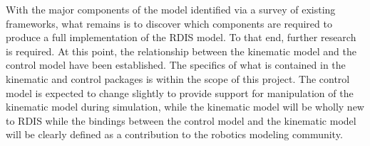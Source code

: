 With the major components of the model identified via a survey of existing frameworks, what remains is to discover which components are required to produce a full implementation of the RDIS model. To that end, further research is required. At this point, the relationship between the kinematic model and the control model have been established. The specifics of what is contained in the kinematic and control packages is within the scope of this project. The control model is expected to change slightly to provide support for manipulation of the kinematic model during simulation, while the kinematic model will be wholly new to RDIS while the bindings between the control model and the kinematic model will be clearly defined as a contribution to the robotics modeling community.


